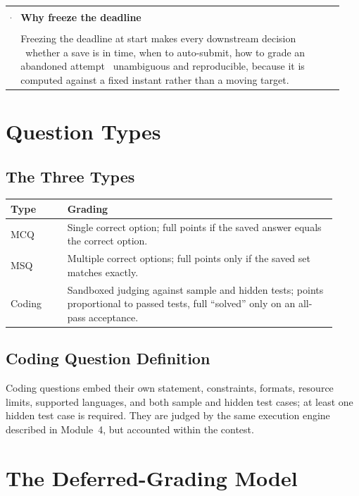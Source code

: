 \documentclass[12pt,a4paper,oneside]{report}
\makeatletter
\newenvironment{callout}[1]{\par\vspace{4pt}\noindent
  \begin{tabular}{@{}p{0.014\linewidth}@{\hspace{0.6em}}p{0.93\linewidth}@{}}
  \textcolor{boxframe}{\rule{2pt}{\baselineskip}} & \textbf{\textcolor{tcetblue}{#1}}\\[2pt] & }{\end{tabular}\par\vspace{6pt}}
\makeatother
\begin{document}
\begin{callout}{Why freeze the deadline}
Freezing the deadline at start makes every downstream decision \textemdash\
whether a save is in time, when to auto-submit, how to grade an abandoned
attempt \textemdash\ unambiguous and reproducible, because it is computed against
a fixed instant rather than a moving target.
\end{callout}

\chapter{Question Types}
\section{The Three Types}
\begin{longtable}{@{}p{0.16\linewidth} p{0.76\linewidth}@{}}
\toprule
\textbf{Type} & \textbf{Grading}\\
\midrule
\endhead
MCQ & Single correct option; full points if the saved answer equals the correct option.\\
MSQ & Multiple correct options; full points only if the saved set matches exactly.\\
Coding & Sandboxed judging against sample and hidden tests; points proportional to passed tests, full ``solved'' only on an all-pass acceptance.\\
\bottomrule
\end{longtable}

\section{Coding Question Definition}
Coding questions embed their own statement, constraints, formats, resource
limits, supported languages, and both sample and hidden test cases; at least one
hidden test case is required. They are judged by the same execution engine
described in Module~4, but accounted within the contest.

\chapter{The Deferred-Grading Model}
\end{document}

